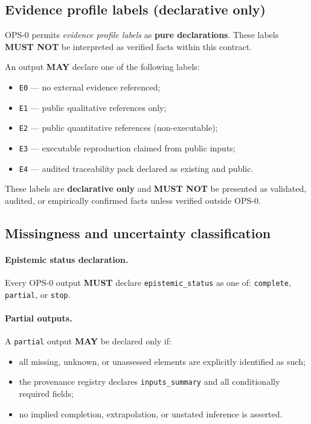 \subsection{Evidence profile labels (declarative only)}
OPS-0 permits \emph{evidence profile labels}
as \textbf{pure declarations}.
These labels \textbf{MUST NOT}
be interpreted as verified facts
within this contract.

An output \textbf{MAY} declare
one of the following labels:

\begin{itemize}
  \item \texttt{E0} --- no external evidence referenced;
  \item \texttt{E1} --- public qualitative references only;
  \item \texttt{E2} --- public quantitative references
        (non-executable);
  \item \texttt{E3} --- executable reproduction claimed
        from public inputs;
  \item \texttt{E4} --- audited traceability pack declared
        as existing and public.
\end{itemize}

These labels are \textbf{declarative only}
and \textbf{MUST NOT}
be presented as validated, audited,
or empirically confirmed facts
unless verified outside OPS-0.

\subsection{Missingness and uncertainty classification}
\paragraph{Epistemic status declaration.}
Every OPS-0 output \textbf{MUST} declare
\texttt{epistemic\_status}
as one of:
\texttt{complete},
\texttt{partial},
or \texttt{stop}.

\paragraph{Partial outputs.}
A \texttt{partial} output \textbf{MAY}
be declared only if:

\begin{itemize}
  \item all missing, unknown,
        or unassessed elements
        are explicitly identified as such;
  \item the provenance registry
        declares \texttt{inputs\_summary}
        and all conditionally required fields;
  \item no implied completion,
        extrapolation,
        or unstated inference is asserted.
\end{itemize}

